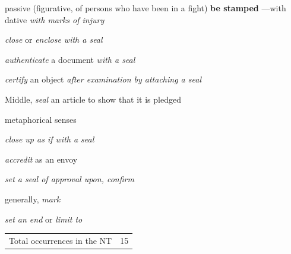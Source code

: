 \begin{compactdesc}
\begin{compactitem}
							\item[3] passive (figurative, of persons who have been in a fight) \textbf{be stamped} ---with dative \textit{with marks of injury}
						\end{compactitem}
					\item[LSJ 1742a, PDF 1813] \textbf{}
						\begin{compactitem}
							\item[I.1] \textit{close} or \textit{enclose with a seal}
							\item[I.2] \textit{authenticate} a document \textit{with a seal}
							\item[I.3] \textit{certify} an object \textit{after examination by attaching a seal}
							\item[I.4] Middle, \textit{seal} an article to show that it is pledged
							\item[II] metaphorical senses
							\item[II.1] \textit{close up as if with a seal}
							\item[II.2] \textit{accredit} as an envoy
							\item[II.3] \textit{set a seal of approval upon, confirm}
							\item[II.4] generally, \textit{mark}
							\item[II.5] \textit{set an end} or \textit{limit to}
						\end{compactitem}
				\end{compactdesc}
				
				\begin{tabular}{ll}
					Total occurrences in the NT & 15
				\end{tabular}
				
